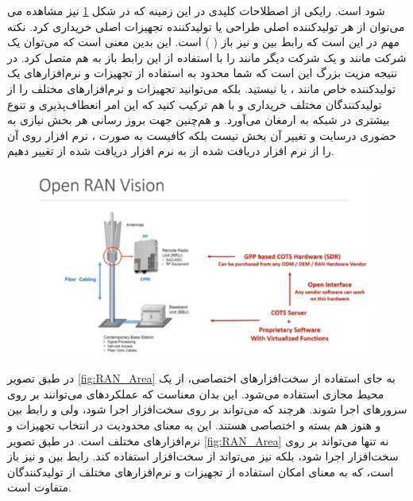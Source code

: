 \documentclass[landscape, 12pt]{report}
\begin{document}
	یکی از اصطلاحات کلیدی در این زمینه که در شکل \ref{fig:Open_RAN_Vision} نیز مشاهده می‎‌شود
	   است.
	     را می‌توان از هر تولیدکننده اصلی طراحی
	       یا تولیدکننده تجهیزات اصلی 
	 خریداری کرد. نکته مهم در 
	 این است که رابط بین
	   و
	     نیز باز (
	      ) است. این 
	بدین معنی است که می‌توان
	 یک شرکت مانند
	   و
	     یک شرکت دیگر مانند
	        را با استفاده از این رابط باز به هم متصل کرد. در نتیجه مزیت بزرگ 
	         این است که شما محدود به استفاده از تجهیزات و نرم‌افزارهای یک تولیدکننده خاص مانند
	          ، 
	          یا
	          نیستید. بلکه می‌توانید تجهیزات و نرم‌افزارهای مختلف را از تولیدکنندگان مختلف خریداری و با هم ترکیب کنید که این امر انعطاف‌پذیری و تنوع بیشتری در شبکه به ارمغان می‌آورد. و هم‌چنین جهت بروز رسانی هر بخش نیازی به حضوری درسایت و تغییر
	            آن بخش نیست بلکه کافیست به صورت
	              ، نرم افزار روی آن را از نرم افزار دریافت شده از
	                 به نرم افزار دریافت شده از
	                    تغییر دهیم.
	
\begin{figure}[ht]
	\centering
	\includegraphics[width=.6\linewidth]{Pic/Open_RAN_Vision}
	\caption{}
	\label{fig:Open_RAN_Vision}
\end{figure}

در
  طبق 
 تصویر \ref{fig:RAN_Area} به جای استفاده از سخت‌افزارهای اختصاصی، از یک محیط مجازی استفاده می‌شود. این بدان معناست که عملکردهای
   می‌توانند بر روی سرورهای 
    اجرا شوند. هرچند که
     می‌تواند بر روی سخت‌افزار  اجرا شود، ولی
       و رابط بین
         و
           هنوز هم بسته و اختصاصی هستند. این به معنای محدودیت در انتخاب تجهیزات و نرم‌افزارهای مختلف است.
در
  طبق تصویر \ref{fig:RAN_Area} نه تنها
    می‌تواند بر روی سخت‌افزار  اجرا شود، بلکه
      نیز می‌تواند از سخت‌افزار 
       استفاده کند. رابط بین
        و
          نیز باز است، که به معنای امکان استفاده از تجهیزات و نرم‌افزارهای مختلف از تولیدکنندگان متفاوت است.
\end{document}
